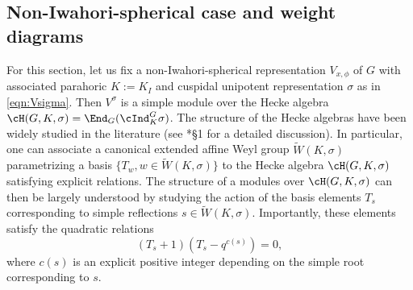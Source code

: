 \subsection{Non-Iwahori-spherical case and weight diagrams}\label{sec:weight_diagram}
For this section, let us fix a non-Iwahori-spherical representation $V_{x,\phi}$ of $G$ with associated parahoric $K:=K_I$ and cuspidal unipotent representation $\sigma$ as in \eqref{eqn:Vsigma}. Then $V^\sigma$ is a simple module over the Hecke algebra $\cH(G,K,\sigma)=\End_G(\cInd_K^G\sigma)$. The structure of the Hecke algebras have been widely studied in the literature (see \cite{Lusztig1995}*{\S 1} for a detailed discussion). In particular, one can associate a canonical extended affine Weyl group $\tilde W(K,\sigma)$ parametrizing a basis $\{T_w, w\in \tilde{W}(K,\sigma)\}$ to the Hecke algebra $\cH(G,K,\sigma)$ satisfying explicit relations. The structure of a modules over $\cH(G,K,\sigma)$ can then be largely understood by studying the action of the basis elements $T_s$ corresponding to simple reflections $s\in \tilde{W}(K,\sigma)$. Importantly, these elements satisfy the quadratic relations $$(T_s+1)(T_s-q^{c(s)})=0,$$
where $c(s)$ is an explicit positive integer depending on the simple root corresponding to $s$.

